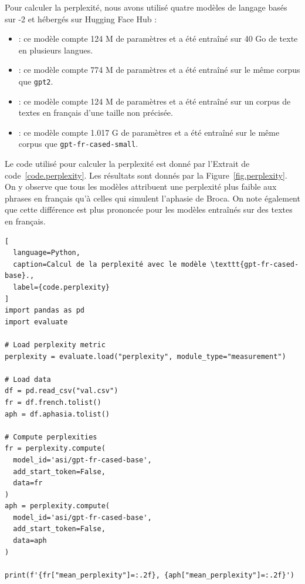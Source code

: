 Pour calculer la perplexité, nous avons utilisé quatre modèles de langage basés sur -2
et hébergés sur \foreignlanguage{english}{Hugging Face Hub} :
\begin{itemize}
  \item {} : 
  ce modèle compte 124 M de paramètres et a été entraîné sur 40 Go de texte en plusieurs langues.
  \item {} :
  ce modèle compte 774 M de paramètres et a été entraîné sur le même corpus que \verb|gpt2|.
  \item {} :
  ce modèle compte 124 M de paramètres et a été entraîné sur un corpus de textes en français d'une taille non précisée.
  \item {} :
  ce modèle compte 1.017 G de paramètres et a été entraîné sur le même corpus que \verb|gpt-fr-cased-small|.
\end{itemize}
Le code utilisé pour calculer la perplexité est donné par l'Extrait de code~\ref{code.perplexity}.
Les résultats sont donnés par la Figure~\ref{fig.perplexity}.
On y observe que tous les modèles attribuent une perplexité plus faible 
aux phrases en français qu'à celles qui simulent l'aphasie de Broca.
On note également que cette différence est plus prononcée pour les modèles entraînés sur des textes en français.

\begin{lstlisting}[
  language=Python,
  caption=Calcul de la perplexité avec le modèle \texttt{gpt-fr-cased-base}.,
  label={code.perplexity}
]
import pandas as pd
import evaluate

# Load perplexity metric
perplexity = evaluate.load("perplexity", module_type="measurement")

# Load data
df = pd.read_csv("val.csv")
fr = df.french.tolist()
aph = df.aphasia.tolist()

# Compute perplexities
fr = perplexity.compute(
  model_id='asi/gpt-fr-cased-base', 
  add_start_token=False, 
  data=fr
)
aph = perplexity.compute(
  model_id='asi/gpt-fr-cased-base', 
  add_start_token=False, 
  data=aph
)

print(f'{fr["mean_perplexity"]=:.2f}, {aph["mean_perplexity"]=:.2f}')
\end{lstlisting}

